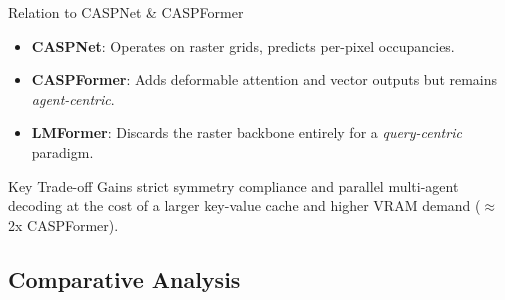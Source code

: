 \documentclass[10pt,aspectratio=169]{beamer}
\begin{document}
\begin{frame}{Relation to CASPNet \& CASPFormer}
    \begin{itemize}
        \item \textbf{CASPNet}: Operates on raster grids, predicts per-pixel occupancies.
        \item \textbf{CASPFormer}: Adds deformable attention and vector outputs but remains \emph{agent-centric}.
        \item \textbf{LMFormer}: Discards the raster backbone entirely for a \emph{query-centric} paradigm.
    \end{itemize}
    \vfill
    \begin{alertblock}{Key Trade-off}
    Gains strict symmetry compliance and parallel multi-agent decoding at the cost of a larger key-value cache and higher VRAM demand (\(\approx\)2x CASPFormer).
    \end{alertblock}
\end{frame}


\subsection{Comparative Analysis}
\end{document}
